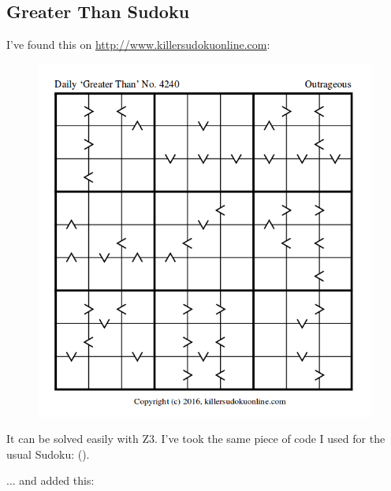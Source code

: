 \subsection{Greater Than Sudoku}

I've found this on \url{http://www.killersudokuonline.com}:

\begin{figure}[H]
\centering
\includegraphics[scale=0.6]{puzzles/sudoku/GT/puzzle.png}
\caption{}
\end{figure}

It can be solved easily with Z3. I've took the same piece of code I used for the usual Sudoku: ().

... and added this:

